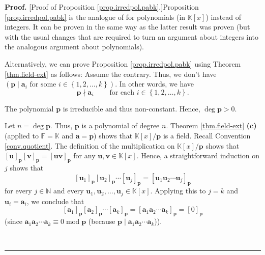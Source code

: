 \documentclass[numbers=enddot,12pt,final,onecolumn,notitlepage]{scrartcl}%
\theoremstyle{definition}
\newenvironment{fineprint}{\begin{small}}{\end{small}}
\newenvironment{proof}[1][Proof]{\noindent\textbf{#1.} }{\ \rule{0.5em}{0.5em}}
\begin{document}
\begin{proof}
[Proof of Proposition \ref{prop.irredpol.pabk}.]Proposition
\ref{prop.irredpol.pabk} is the analogue of \cite[Proposition 2.13.7]{19s} for
polynomials (in $\mathbb{K}\left[  x\right]  $) instead of integers. It can be
proven in the same way as the latter result was proven (but with the usual
changes that are required to turn an argument about integers into the
analogous argument about polynomials).

\begin{fineprint}
Alternatively, we can prove Proposition \ref{prop.irredpol.pabk} using Theorem
\ref{thm.field-ext} as follows: Assume the contrary. Thus, we don't have
$\left(  \mathbf{p}\mid\mathbf{a}_{i}\text{ for some }i\in\left\{
1,2,\ldots,k\right\}  \right)  $. In other words, we have%
\begin{equation}
\mathbf{p}\nmid\mathbf{a}_{i}\ \ \ \ \ \ \ \ \ \ \text{for each }i\in\left\{
1,2,\ldots,k\right\}  . \label{pf.prop.irredpol.pabk.atc}%
\end{equation}


The polynomial $\mathbf{p}$ is irreducible and thus non-constant. Hence,
$\deg\mathbf{p}>0$.

Let $n=\deg\mathbf{p}$. Thus, $\mathbf{p}$ is a polynomial of degree $n$.
Theorem \ref{thm.field-ext} \textbf{(c)} (applied to $\mathbb{F}=\mathbb{K}$
and $\mathbf{a}=\mathbf{p}$) shows that $\mathbb{K}\left[  x\right]
/\mathbf{p}$ is a field. Recall Convention \ref{conv.quotient}. The definition
of the multiplication on $\mathbb{K}\left[  x\right]  /\mathbf{p}$ shows that
$\left[  \mathbf{u}\right]  _{\mathbf{p}}\left[  \mathbf{v}\right]
_{\mathbf{p}}=\left[  \mathbf{uv}\right]  _{\mathbf{p}}$ for any
$\mathbf{u},\mathbf{v}\in\mathbb{K}\left[  x\right]  $. Hence, a
straightforward induction on $j$ shows that%
\[
\left[  \mathbf{u}_{1}\right]  _{\mathbf{p}}\left[  \mathbf{u}_{2}\right]
_{\mathbf{p}}\cdots\left[  \mathbf{u}_{j}\right]  _{\mathbf{p}}=\left[
\mathbf{u}_{1}\mathbf{u}_{2}\cdots\mathbf{u}_{j}\right]  _{\mathbf{p}}%
\]
for every $j\in\mathbb{N}$ and every $\mathbf{u}_{1},\mathbf{u}_{2}%
,\ldots,\mathbf{u}_{j}\in\mathbb{K}\left[  x\right]  $. Applying this to $j=k$
and $\mathbf{u}_{i}=\mathbf{a}_{i}$, we conclude that
\[
\left[  \mathbf{a}_{1}\right]  _{\mathbf{p}}\left[  \mathbf{a}_{2}\right]
_{\mathbf{p}}\cdots\left[  \mathbf{a}_{k}\right]  _{\mathbf{p}}=\left[
\mathbf{a}_{1}\mathbf{a}_{2}\cdots\mathbf{a}_{k}\right]  _{\mathbf{p}}=\left[
0\right]  _{\mathbf{p}}%
\]
(since $\mathbf{a}_{1}\mathbf{a}_{2}\cdots\mathbf{a}_{k}\equiv
0\operatorname{mod}\mathbf{p}$ (because $\mathbf{p}\mid\mathbf{a}%
_{1}\mathbf{a}_{2}\cdots\mathbf{a}_{k}$)).


\end{fineprint}
\end{proof}
\end{document}
